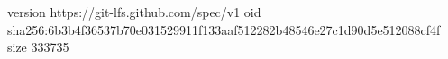 version https://git-lfs.github.com/spec/v1
oid sha256:6b3b4f36537b70e031529911f133aaf512282b48546e27c1d90d5e512088cf4f
size 333735
